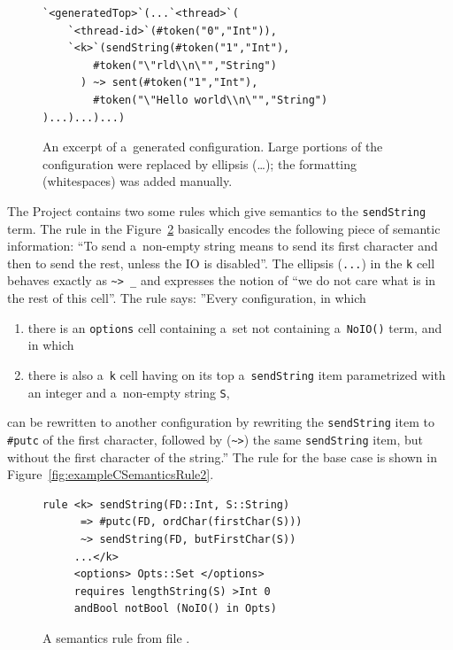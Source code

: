 \documentclass[nolot,nolof,nocover,printed]{fithesis3}
\begin{document}
\begin{figure}[hp]
\begin{lstlisting}
`<generatedTop>`(...`<thread>`(
    `<thread-id>`(#token("0","Int")),
    `<k>`(sendString(#token("1","Int"),
        #token("\"rld\\n\"","String")
      ) ~> sent(#token("1","Int"),
        #token("\"Hello world\\n\"","String")
)...)...)...)
\end{lstlisting}
\caption{An excerpt of a~generated configuration. Large portions of the configuration were replaced by ellipsis (\ldots); the formatting (whitespaces) was added manually.}
\label{exampleConfigurationOutput}
\end{figure}

The Project contains two some rules which give semantics to the \lstinline|sendString| term.
The rule in the Figure~\ref{fig:exampleCSemanticsRule} basically encodes the following piece of semantic information: \enquote{To send a~non-empty string means to send its first character and then to send the rest, unless the IO is disabled}. The ellipsis (\lstinline|...|) in the \lstinline|k| cell behaves exactly as \lstinline|~> _| and expresses the notion of \enquote{we do not care what is in the rest of this cell}. The rule says: ''Every configuration, in which
\begin{enumerate}
\item there is an \lstinline|options| cell containing a~set not containing a~\lstinline|NoIO()| term, and in which
\item there is also a~\lstinline|k| cell having on its top a~\lstinline|sendString| item parametrized with an integer and a~non-empty string \lstinline|S|,
\end{enumerate}
can be rewritten to another configuration by rewriting the \lstinline|sendString| item to \lstinline|#putc| of the first character, followed by (\lstinline|~>|) the same \lstinline|sendString| item, but without the first character of the string.'' The rule for the base case is shown in Figure~\ref{fig:exampleCSemanticsRule2}.

\begin{figure}[hp]
\begin{lstlisting}
rule <k> sendString(FD::Int, S::String)
      => #putc(FD, ordChar(firstChar(S)))
      ~> sendString(FD, butFirstChar(S))
     ...</k>
     <options> Opts::Set </options>
     requires lengthString(S) >Int 0
     andBool notBool (NoIO() in Opts)
\end{lstlisting}
\caption{A semantics rule from file \protect{}.}
\label{fig:exampleCSemanticsRule}
\end{figure}
\end{document}
